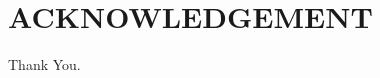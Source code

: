 \documentclass[3p,authoryear,times,twocolumn]{elsarticle_issw2018}
\begin{document}
\section*{ACKNOWLEDGEMENT} 
Thank You.





%
%
%
%
%


\end{document}
